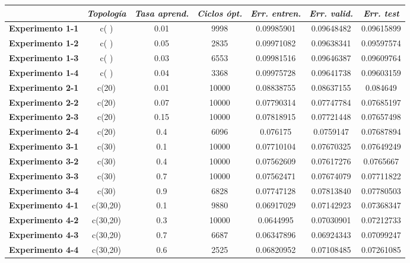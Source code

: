 \documentclass{uc3mpracticas}
\begin{document}
    \begin{center}
      \begin{tabular}{|l|c|c|c|c|c|c|}
        \hline
        & \textit{\textbf{Topología}} & \textit{\textbf{Tasa aprend.}} & \textit{\textbf{Ciclos ópt.}} & \textit{\textbf{Err. entren.}} & \textit{\textbf{Err. valid.}} & \textit{\textbf{Err. test}}\\ \hline \hline
        \textbf{Experimento 1-1}&  c( )      &  0.01  &  9998   &  0.09985901  &  0.09648482  &  0.09615899  \\ \hline
        \textbf{Experimento 1-2}&  c( )      &  0.05  &  2835   &  0.09971082  &  0.09638341  &  0.09597574  \\ \hline
        \textbf{Experimento 1-3}&  c( )      &  0.03  &  6553   &  0.09981516  &  0.09646387  &  0.09609764  \\ \hline
        \textbf{Experimento 1-4}&  c( )      &  0.04  &  3368   &  0.09975728  &  0.09641738  &  0.09603159  \\ \hline \hline
        \textbf{Experimento 2-1}&  c(20)     &  0.01  &  10000  &  0.08838755  &  0.08637155  &  0.084649    \\ \hline
        \textbf{Experimento 2-2}&  c(20)     &  0.07  &  10000  &  0.07790314  &  0.07747784  &  0.07685197  \\ \hline
        \textbf{Experimento 2-3}&  c(20)     &  0.15  &  10000  &  0.07818915  &  0.07721448  &  0.07657498  \\ \hline
        \textbf{Experimento 2-4}&  c(20)     &  0.4   &  6096   &  0.076175    &  0.0759147   &  0.07687894  \\ \hline \hline
        \textbf{Experimento 3-1}&  c(30)     &  0.1   &  10000  &  0.07710104  &  0.07670325  &  0.07649249  \\ \hline
        \textbf{Experimento 3-2}&  c(30)     &  0.4   &  10000  &  0.07562609  &  0.07617276  &  0.0765667   \\ \hline
        \textbf{Experimento 3-3}&  c(30)     &  0.7   &  10000  &  0.07562471  &  0.07674079  &  0.07711822  \\ \hline
        \textbf{Experimento 3-4}&  c(30)     &  0.9   &  6828   &  0.07747128  &  0.07813840  &  0.07780503  \\ \hline \hline
        \textbf{Experimento 4-1}&  c(30,20)  &  0.1   &  9880   &  0.06917029  &  0.07142923  &  0.07368347  \\ \hline
        \textbf{Experimento 4-2}&  c(30,20)  &  0.3   &  10000  &  0.0644995   &  0.07030901  &  0.07212733  \\ \hline
        \textbf{Experimento 4-3}&  c(30,20)  &  0.7   &  6687   &  0.06347896  &  0.06924343  &  0.07099247  \\ \hline
        \textbf{Experimento 4-4}&  c(30,20)  &  0.6   &  2525   &  0.06820952  &  0.07108485  &  0.07261085  \\ \hline
      \end{tabular}
    \end{center}
\end{document}
